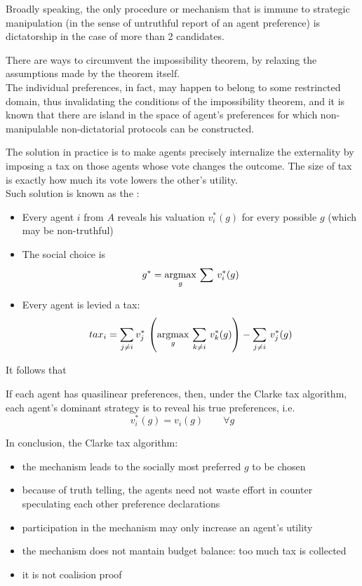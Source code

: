 Broadly speaking, the only procedure or mechanism that is immune to strategic manipulation (in the sense of untruthful report of an agent preference) is dictatorship in the case of more than 2 candidates.

There are ways to circumvent the impossibility theorem, by relaxing the assumptions made by the theorem itself.\\
The individual preferences, in fact, may happen to belong to some restrincted domain, thus invalidating the conditions of the impossibility theorem, and it is known that there are island in the space of agent's preferences for which non-manipulable non-dictatorial protocols can be constructed.

The solution in practice is to make agents precisely internalize the externality by imposing a tax on those agents whose vote changes the outcome. The size of tax is exactly how much its vote lowers the other's utility.\\
Such solution is known as the :
\begin{itemize}
\item Every agent $i$ from $A$ reveals his valuation $v^*_i(g)$ for every possible $g$ (which may be non-truthful)
\item The social choice is 
\[g^* =\operatorname*{argmax}_g \, \sum \,v^*_i(g)\]
\item Every agent is levied a tax:
\[tax_i = \sum_{j\ne i} v^*_j\,\left(\operatorname*{argmax}_g\, \sum _{k\ne i}\,v^*_k(g)\right) - \sum_{j\ne i}\,v^*_j(g)\]
\end{itemize}
It follows that
\begin{theorem}
If each agent has quasilinear preferences, then, under the Clarke tax algorithm, each agent's dominant strategy is to reveal his true preferences, i.e. 
\[v^*_i(g) = v_i(g) \qquad\forall g\]
\end{theorem}

In conclusion, the Clarke tax algorithm:
\begin{itemize}
\item the mechanism leads to the socially most preferred $g$ to be chosen
\item because of truth telling, the agents need not waste effort in counter speculating each other preference declarations
\item participation in the mechanism may only increase an agent's utility
\item the mechanism does not mantain budget balance: too much tax is collected
\item it is not coalision proof 
\end{itemize}

